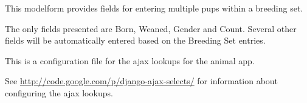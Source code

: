 \documentclass[letterpaper,10pt,english]{sphinxmanual}
\begin{document}

\begin{fulllineitems}
\label{animals:mousedb.animal.forms.MultipleBreedingAnimalForm}
This modelform provides fields for entering multiple pups within a breeding set.

The only fields presented are Born, Weaned, Gender and Count.  Several other fields will be automatically entered based on the Breeding Set entries.

\end{fulllineitems}

\label{animals:module-mousedb.animal.lookups}
This is a configuration file for the ajax lookups for the animal app.

See \href{http://code.google.com/p/django-ajax-selects/}{http://code.google.com/p/django-ajax-selects/} for information about configuring the ajax lookups.
\end{document}
